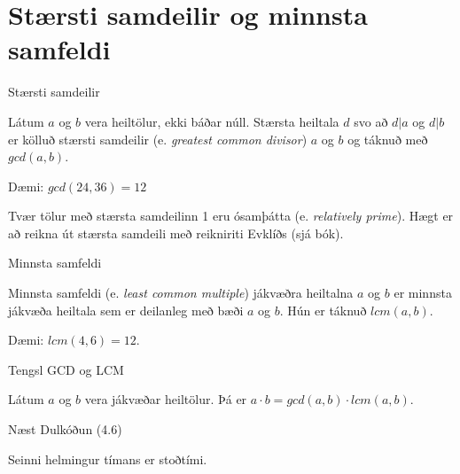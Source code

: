 \documentclass{beamer}
\begin{document}
\section{Stærsti samdeilir og minnsta samfeldi}

\begin{frame}{Stærsti samdeilir}
\begin{tcolorbox}[title=Stærsti samdeilir]
Látum $a$ og $b$ vera heiltölur, ekki báðar núll. Stærsta heiltala $d$ svo að $d|a$ og $d|b$ er kölluð stærsti samdeilir (e. \emph{greatest common divisor}) $a$ og $b$ og táknuð með $gcd(a, b)$.
\end{tcolorbox}
Dæmi: $gcd(24, 36) = 12$

Tvær tölur með stærsta samdeilinn 1 eru ósamþátta (e. \emph{relatively prime}). Hægt er að reikna út stærsta samdeili með reikniriti Evklíðs (sjá bók).
\end{frame}

\begin{frame}{Minnsta samfeldi}
\begin{tcolorbox}[title=Minnsta samfeldi]
Minnsta samfeldi (e. \emph{least common multiple}) jákvæðra heiltalna $a$ og $b$ er minnsta jákvæða heiltala sem er deilanleg með bæði $a$ og $b$. Hún er táknuð $lcm(a, b)$.
\end{tcolorbox}
Dæmi: $lcm(4, 6) = 12$.
\end{frame}

\begin{frame}{Tengsl GCD og LCM}
\begin{tcolorbox}[title=GCD og LCM]
Látum $a$ og $b$ vera jákvæðar heiltölur. Þá er $a\cdot b = gcd(a, b) \cdot lcm(a, b)$.
\end{tcolorbox}
\end{frame}



\begin{frame}{Næst}
Dulkóðun (4.6)

Seinni helmingur tímans er stoðtími.
\end{frame}
\end{document}
